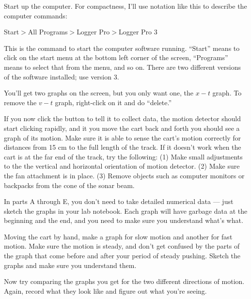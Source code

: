 Start up the computer. For compactness, I'll use notation
like this to describe the computer commands:

Start$>$All Programs$>$Logger Pro$>$Logger Pro 3

This is the command to start the computer software running.
``Start'' means to click on the start menu at the bottom
left corner of the screen, ``Programs'' means to select that
from the menu, and so on. There are two different versions of the
software installed; use version 3.

You'll get
two graphs on the screen, but you only want one, the $x-t$
graph. To remove the $v-t$ graph, right-click on it and do ``delete.''

If you now click the button to tell it to collect data, the
motion detector should start clicking rapidly, and it you
move the cart back and forth you should see a graph of its
motion. Make sure it is able to sense the cart's motion
correctly for distances from 15 cm to the full length of the
track. If it doesn't work when the cart is at the far end of
the track, try the following: (1) Make small adjustments to the the vertical and horizontal
orientation of motion detector. (2) Make sure the fan attachment is in place.
(3) Remove objects such as computer monitors or backpacks from the cone of
the sonar beam.

\observations

In parts A through E, you don't need to take
detailed numerical data --- just sketch the graphs in your lab
notebook. Each graph will have garbage data at the beginning
and the end, and you need to make sure you understand what's what.

\label{part:kinematics:fastandslow}

Moving the cart by hand, make a graph for slow motion and
another for fast motion. Make sure the motion is steady, and
don't get confused by the parts of the graph that come
before and after your period of steady pushing. Sketch the
graphs and make sure you understand them.


Now try comparing the graphs you get for the two different
directions of motion. Again, record what they look like and
figure out what you're seeing.


